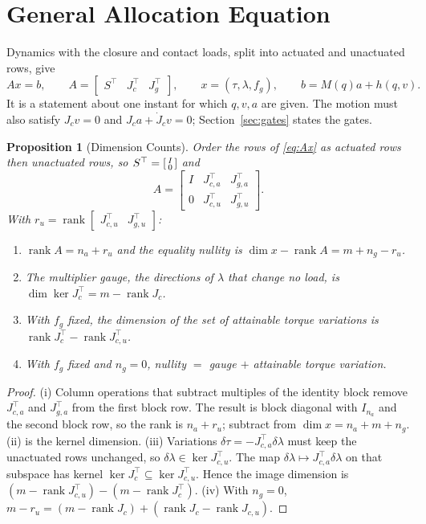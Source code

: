 \documentclass[11pt,a4paper]{article}
\newtheorem{proposition}{Proposition}
\newcommand{\rank}{\operatorname{rank}}
\newcommand{\kernel}{\operatorname{ker}}
\begin{document}
\section{General Allocation Equation}
\label{sec:allocation}

Dynamics with the closure and contact loads, split into actuated and unactuated
rows, give
\begin{equation}
A x = b,\qquad A=\begin{bmatrix}S^{\top} & J_c^{\top} & J_g^{\top}\end{bmatrix},
\qquad x=(\tau,\lambda,f_g),\qquad b=M(q)a+h(q,v).
\label{eq:Ax}
\end{equation}
It is a statement about one instant for which $q,v,a$ are given.  The motion
must also satisfy $J_c v=0$ and $J_c a+\dot J_c v=0$; Section~\ref{sec:gates}
states the gates.

\begin{proposition}[Dimension Counts]\label{prop:counts}
Order the rows of \eqref{eq:Ax} as actuated rows then unactuated rows, so
$S^{\top}=\begin{bsmallmatrix}I\\0\end{bsmallmatrix}$ and
\[
A=\begin{bmatrix} I & J_{c,a}^{\top} & J_{g,a}^{\top}\\
0 & J_{c,u}^{\top} & J_{g,u}^{\top}\end{bmatrix}.
\]
With $r_u=\rank\begin{bmatrix}J_{c,u}^{\top}&J_{g,u}^{\top}\end{bmatrix}$:
\begin{enumerate}[label=(\roman*)]
\item $\rank A=n_a+r_u$ and the equality nullity is
$\dim x-\rank A=m+n_g-r_u$.
\item The multiplier gauge, the directions of $\lambda$ that change no load, is
$\dim\kernel J_c^{\top}=m-\rank J_c$.
\item With $f_g$ fixed, the dimension of the set of attainable torque variations
is $\rank J_c^{\top}-\rank J_{c,u}^{\top}$.
\item With $f_g$ fixed and $n_g=0$, nullity $=$ gauge $+$ attainable torque
variation.
\end{enumerate}
\end{proposition}
\begin{proof}
(i) Column operations that subtract multiples of the identity block remove
$J_{c,a}^{\top}$ and $J_{g,a}^{\top}$ from the first block row.  The result is
block diagonal with $I_{n_a}$ and the second block row, so the rank is
$n_a+r_u$; subtract from $\dim x=n_a+m+n_g$.  (ii) is the kernel dimension.
(iii) Variations $\delta\tau=-J_{c,a}^{\top}\delta\lambda$ must keep the
unactuated rows unchanged, so $\delta\lambda\in\kernel J_{c,u}^{\top}$.  The
map $\delta\lambda\mapsto J_{c,a}^{\top}\delta\lambda$ on that subspace has
kernel $\kernel J_c^{\top}\subseteq\kernel J_{c,u}^{\top}$.  Hence the image
dimension is $(m-\rank J_{c,u}^{\top})-(m-\rank J_c^{\top})$.  (iv) With
$n_g=0$, $m-r_u=(m-\rank J_c)+(\rank J_c-\rank J_{c,u})$.
\end{proof}
\end{document}
